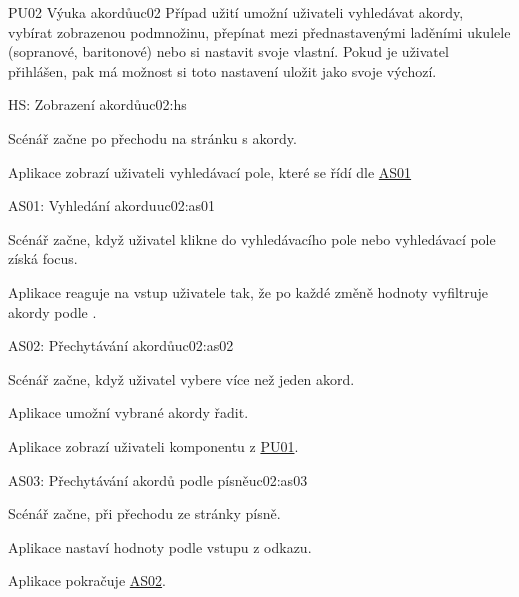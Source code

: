 \begin{usecase}{PU02 Výuka akordů}{uc02}
    Případ užití umožní uživateli vyhledávat akordy, vybírat zobrazenou podmnožinu, přepínat mezi přednastavenými laděními ukulele (sopranové, baritonové) nebo si nastavit svoje vlastní. Pokud je uživatel přihlášen, pak má možnost si toto nastavení uložit jako svoje výchozí.

    \begin{scenario}{HS: Zobrazení akordů}{uc02:hs}
        \item Scénář začne po přechodu na stránku s akordy.
        \item Aplikace zobrazí uživateli vyhledávací pole, které se řídí dle \hyperref[uc02:as01]{AS01}
    \end{scenario}

    \begin{scenario}{AS01: Vyhledání akordu}{uc02:as01}
        \item Scénář začne, když uživatel klikne do vyhledávacího pole nebo vyhledávací pole získá focus.
        \item Aplikace reaguje na vstup uživatele tak, že po každé změně hodnoty vyfiltruje akordy podle .
    \end{scenario}

    \begin{scenario}{AS02: Přechytávání akordů}{uc02:as02}
        \item Scénář začne, když uživatel vybere více než jeden akord.
        \item Aplikace umožní vybrané akordy řadit.
        \item Aplikace zobrazí uživateli komponentu z \hyperref[uc01]{PU01}.
    \end{scenario}

    \begin{scenario}{AS03: Přechytávání akordů podle písně}{uc02:as03}
        \item Scénář začne, při přechodu ze stránky písně.
        \item Aplikace nastaví hodnoty podle vstupu z odkazu.
        \item Aplikace pokračuje \hyperref[uc02:as02]{AS02}.
    \end{scenario}



\end{usecase}

